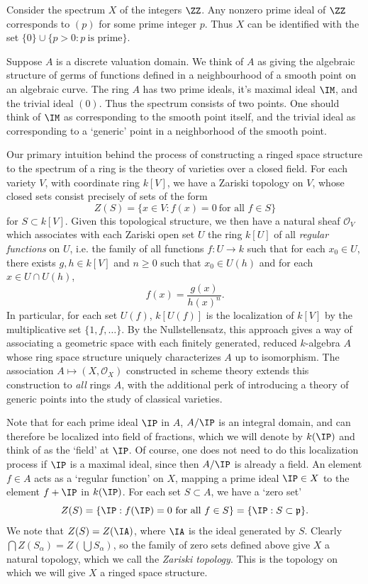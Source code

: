 \begin{example}
    Consider the spectrum $X$ of the integers $\ZZ$. Any nonzero prime ideal of $\ZZ$ corresponds to $(p)$ for some prime integer $p$. Thus $X$ can be identified with the set $\{ 0 \} \cup \{ p > 0 : p\ \text{is prime} \}$.
\end{example}

\begin{example}
    Suppose $A$ is a discrete valuation domain. We think of $A$ as giving the algebraic structure of germs of functions defined in a neighbourhood of a smooth point on an algebraic curve. The ring $A$ has two prime ideals, it's maximal ideal $\IM$, and the trivial ideal $(0)$. Thus the spectrum consists of two points. One should think of $\IM$ as corresponding to the smooth point itself, and the trivial ideal as corresponding to a `generic' point in a neighborhood of the smooth point.
\end{example}

Our primary intuition behind the process of constructing a ringed space structure to the spectrum of a ring is the theory of varieties over a closed field. For each variety $V$, with coordinate ring $k[V]$, we have a Zariski topology on $V$, whose closed sets consist precisely of sets of the form
%
\[ Z(S) = \{ x \in V: f(x) = 0\ \text{for all $f \in S$} \} \]
%
for $S \subset k[V]$. Given this topological structure, we then have a natural sheaf $\mathcal{O}_V$ which associates with each Zariski open set $U$ the ring $k[U]$ of all \emph{regular functions} on $U$, i.e. the family of all functions $f: U \to k$ such that for each $x_0 \in U$, there exists $g,h \in k[V]$ and $n \geq 0$ such that $x_0 \in U(h)$ and for each $x \in U \cap U(h)$,
%
\[ f(x) = \frac{g(x)}{h(x)^n}. \]
%
In particular, for each set $U(f)$, $k[U(f)]$ is the localization of $k[V]$ by the multiplicative set $\{ 1, f, \dots \}$. By the Nullstellensatz, this approach gives a way of associating a geometric space with each finitely generated, reduced $k$-algebra $A$ whose ring space structure uniquely characterizes $A$ up to isomorphism. The association $A \mapsto (X,\mathcal{O}_X)$ constructed in scheme theory extends this construction to \emph{all} rings $A$, with the additional perk of introducing a theory of generic points into the study of classical varieties.

Note that for each prime ideal $\IP$ in $A$, $A/\IP$ is an integral domain, and can therefore be localized into field of fractions, which we will denote by $k(\IP)$ and think of as the `field' at $\IP$. Of course, one does not need to do this localization process if $\IP$ is a maximal ideal, since then $A/\IP$ is already a field. An element $f \in A$ acts as a `regular function' on $X$, mapping a prime ideal $\IP \in X$ to the element $f + \IP$ in $k(\IP)$. For each set $S \subset A$, we have a `zero set'
%
\[ Z(S) = \{ \IP: f(\IP) = 0\ \text{for all $f \in S$} \} = \{ \IP: S \subset \mathfrak{p} \}. \]
%
We note that $Z(S) = Z(\IA)$, where $\IA$ is the ideal generated by $S$. Clearly $\bigcap Z(S_\alpha) = Z(\bigcup S_\alpha)$, so the family of zero sets defined above give $X$ a natural topology, which we call the \emph{Zariski topology}. This is the topology on which we will give $X$ a ringed space structure.

